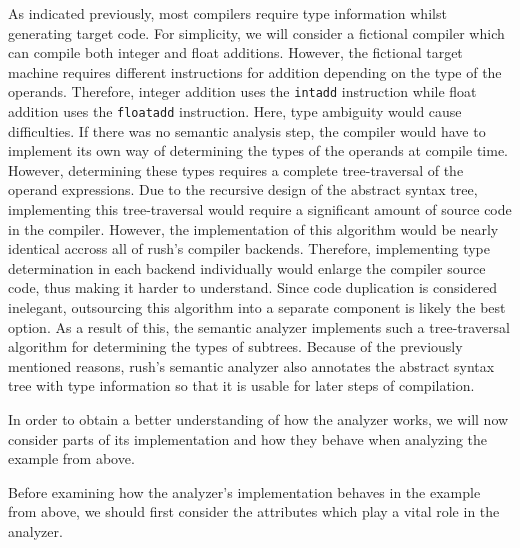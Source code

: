 As indicated previously, most compilers require type information whilst
generating target code. For simplicity, we will consider a fictional compiler
which can compile both integer and float additions. However, the fictional
target machine requires different instructions for addition depending on the
type of the operands. Therefore, integer addition uses the \texttt{intadd} instruction
while float addition uses the \texttt{floatadd} instruction. Here, type ambiguity would
cause difficulties. If there was no semantic analysis step, the compiler would
have to implement its own way of determining the types of the operands at
compile time. However, determining these types requires a complete
tree-traversal of the operand expressions. Due to the recursive design of the
abstract syntax tree, implementing this tree-traversal would require a
significant amount of source code in the compiler. However, the implementation
of this algorithm would be nearly identical accross all of rush's compiler
backends. Therefore, implementing type determination in each backend
individually would enlarge the compiler source code, thus making it harder to
understand. Since code duplication is considered inelegant, outsourcing this
algorithm into a separate component is likely the best option. As a result of
this, the semantic analyzer implements such a tree-traversal algorithm for
determining the types of subtrees. Because of the previously mentioned reasons,
rush's semantic analyzer also annotates the abstract syntax tree with type
information so that it is usable for later steps of compilation.

In order to obtain a better understanding of how the analyzer works, we will now
consider parts of its implementation and how they behave when analyzing the
example from above.


Before examining how the analyzer's implementation behaves in the example from above,
we should first consider the attributes which play a vital role in the analyzer.





